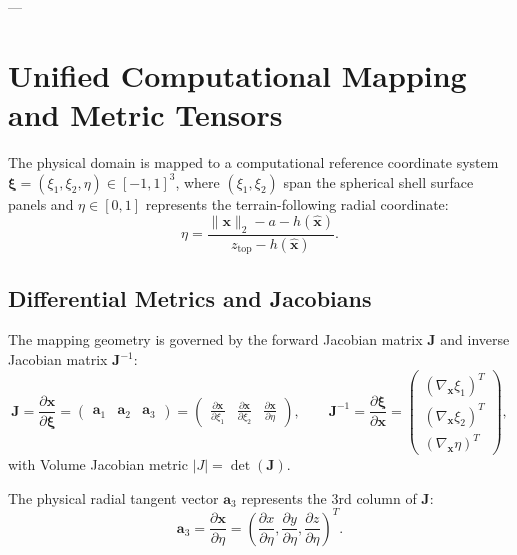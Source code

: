 \documentclass[11pt,a4paper]{article}
\begin{document}
---

\section{Unified Computational Mapping and Metric Tensors}

The physical domain is mapped to a computational reference coordinate system $\boldsymbol{\xi} = (\xi_1, \xi_2, \eta) \in [-1, 1]^3$, where $(\xi_1, \xi_2)$ span the spherical shell surface panels and $\eta \in [0, 1]$ represents the terrain-following radial coordinate:
\begin{equation}
\eta = \frac{\|\boldsymbol{x}\|_2 - a - h(\hat{\boldsymbol{x}})}{z_{\text{top}} - h(\hat{\boldsymbol{x}})}.
\end{equation}

\subsection{Differential Metrics and Jacobians}
The mapping geometry is governed by the forward Jacobian matrix $\mathbf{J}$ and inverse Jacobian matrix $\mathbf{J}^{-1}$:
\begin{equation}
\mathbf{J} = \frac{\partial \boldsymbol{x}}{\partial \boldsymbol{\xi}} = \begin{pmatrix} \boldsymbol{a}_1 & \boldsymbol{a}_2 & \boldsymbol{a}_3 \end{pmatrix} = \begin{pmatrix} \frac{\partial \boldsymbol{x}}{\partial \xi_1} & \frac{\partial \boldsymbol{x}}{\partial \xi_2} & \frac{\partial \boldsymbol{x}}{\partial \eta} \end{pmatrix}, \qquad
\mathbf{J}^{-1} = \frac{\partial \boldsymbol{\xi}}{\partial \boldsymbol{x}} = \begin{pmatrix} (\nabla_{\boldsymbol{x}} \xi_1)^T \\[2pt] (\nabla_{\boldsymbol{x}} \xi_2)^T \\[2pt] (\nabla_{\boldsymbol{x}} \eta)^T \end{pmatrix},
\end{equation}
with Volume Jacobian metric $|J| = \det(\mathbf{J})$.

The physical radial tangent vector $\boldsymbol{a}_3$ represents the 3rd column of $\mathbf{J}$:
\begin{equation}
\boldsymbol{a}_3 = \frac{\partial \boldsymbol{x}}{\partial \eta} = \left( \frac{\partial x}{\partial \eta}, \frac{\partial y}{\partial \eta}, \frac{\partial z}{\partial \eta} \right)^T.
\end{equation}
\end{document}
